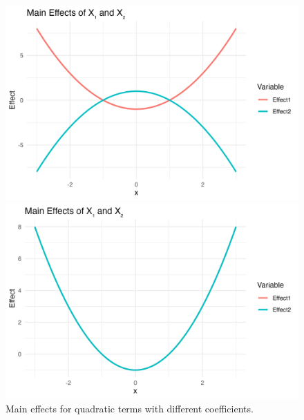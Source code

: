 \begin{figure}[htpb]
\begin{minipage}[t]{0.49\textwidth}
    \end{minipage}
    \hfill
    \begin{minipage}[t]{0.49\textwidth}
        \centering
        \includegraphics[width=\textwidth]{images/quadratic_a1p00_a2p00_a11p10_a22m10_a12p00_rhop00_main.png}
    \end{minipage}
    \hfill
    \begin{minipage}[t]{0.49\textwidth}
        \centering
        \includegraphics[width=\textwidth]{images/quadratic_a1p00_a2p00_a11p10_a22p10_a12p00_rhop00_main.png}
    \end{minipage}
    \caption{Main effects for quadratic terms with different coefficients.}
    \label{fig:quadratic_main_effects}
\end{figure}

